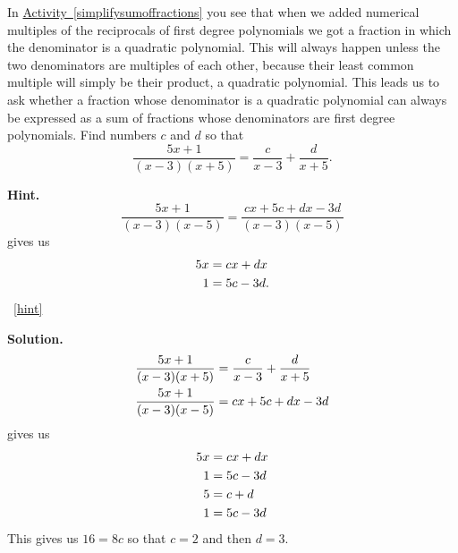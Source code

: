 \documentclass{book}
\begin{document}
\setcounter{project}{264}
\addtocounter{project}{-1}
\begin{activity}[]\label{partialfractionsintro}
\hypertarget{p-1372}{}%
In \hyperref[simplifysumoffractions]{Activity~\ref{simplifysumoffractions}} you see that when we added numerical multiples of the reciprocals of first degree polynomials we got a fraction in which the denominator is a quadratic polynomial. This will always happen unless the two denominators are multiples of each other, because their least common multiple will simply be their product, a quadratic polynomial. This leads us to ask whether a fraction whose denominator is a quadratic polynomial can always be expressed as a sum of fractions whose denominators are first degree polynomials. Find numbers \(c\) and \(d\) so that%
\begin{equation*}
\frac{5x+1}{(x-3)(x+5)} = \frac{c}{x-3} + \frac{d}{x+5}.
\end{equation*}
%
\par\smallskip%
\noindent\textbf{Hint.}\hypertarget{hint-169}{}\quad%
\hypertarget{p-1373}{}%
%
\begin{equation*}
\frac{5x+1}{(x-3)(x-5)} = \frac{cx+5c+dx-3d}{(x-3)(x-5)}
\end{equation*}
gives us%
\begin{align*}
5x & = cx+dx\\
1 &= 5c-3d\text{.}
\end{align*}
%
~\hfill{\tiny\hyperlink{a-264}{[hint]}\hypertarget{q-264}{}}\par\smallskip%
\noindent\textbf{Solution.}\hypertarget{solution-166}{}\quad%
\hypertarget{p-1374}{}%
%
\begin{align*}
\frac{5x+1}{(x-3)(x+5)}  &=  \frac{c}{x-3} + \frac{d}{x+5}\\
\frac{5x+1}{(x-3)(x-5)}  &= cx+5c+dx-3d
\end{align*}
gives us%
\begin{align*}
5x &= cx+dx\\
1 &= 5c-3d\\
5 &= c+d\\
1 &= 5c-3d
\end{align*}
This gives us \(16=8c\) so that \(c=2\) and then \(d=3\).%
\end{activity}

\clearpage
\end{document}
